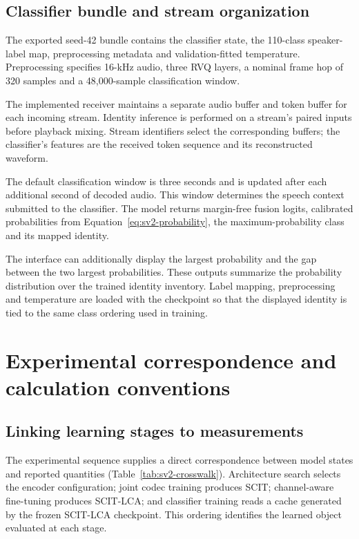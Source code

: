 \subsection{Classifier bundle and stream organization}
The exported seed-42 bundle contains the classifier state, the 110-class speaker-label map, preprocessing metadata and validation-fitted temperature. Preprocessing specifies 16-kHz audio, three RVQ layers, a nominal frame hop of 320 samples and a 48,000-sample classification window.

The implemented receiver maintains a separate audio buffer and token buffer for each incoming stream. Identity inference is performed on a stream's paired inputs before playback mixing. Stream identifiers select the corresponding buffers; the classifier's features are the received token sequence and its reconstructed waveform.

The default classification window is three seconds and is updated after each additional second of decoded audio. This window determines the speech context submitted to the classifier. The model returns margin-free fusion logits, calibrated probabilities from Equation~\ref{eq:sv2-probability}, the maximum-probability class and its mapped identity.

The interface can additionally display the largest probability and the gap between the two largest probabilities. These outputs summarize the probability distribution over the trained identity inventory. Label mapping, preprocessing and temperature are loaded with the checkpoint so that the displayed identity is tied to the same class ordering used in training.

\section{Experimental correspondence and calculation conventions}
\label{sec:sv2-correspondence}

\subsection{Linking learning stages to measurements}
The experimental sequence supplies a direct correspondence between model states and reported quantities (Table~\ref{tab:sv2-crosswalk}). Architecture search selects the encoder configuration; joint codec training produces SCIT; channel-aware fine-tuning produces SCIT-LCA; and classifier training reads a cache generated by the frozen SCIT-LCA checkpoint. This ordering identifies the learned object evaluated at each stage.

